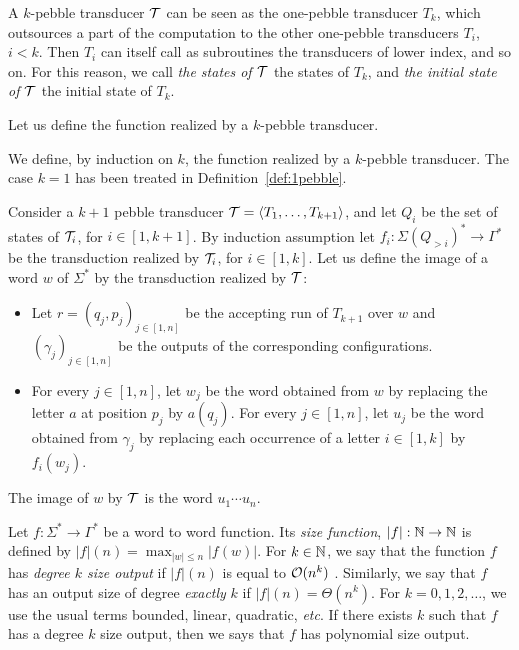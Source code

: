  \medskip
\begin{terminology} 
 A $k$-pebble transducer ${\mathcal T}$ can be seen as the one-pebble transducer $T_k$, which outsources a part of the computation to the other one-pebble transducers $T_i$, $i<k$. Then $T_i$ can itself call as subroutines the transducers of lower index, and so on.
 For this reason, we call \emph{the states of ${\mathcal T}$} the states of $T_k$, and \emph{the initial state of ${\mathcal T}$} the initial state of $T_k$. 
  \end{terminology}
  
  \smallskip
 Let us define the function realized by a $k$-pebble transducer. 
  
  \begin{definition}
We define, by induction on $k$, the function realized by a $k$-pebble transducer. The case $k=1$ has been treated in Definition~\ref{def:1pebble}. 

Consider a $k+1$ pebble transducer ${\mathcal T}=\langle T_1,\ldots,T_{k+1} \rangle$, and let $Q_i$ be the set of states of ${\mathcal T}_i$, for $i\in [1,k+1]$. By induction assumption let $f_i:\Sigma(Q_{>i})^*\rightarrow \Gamma^*$ be the transduction realized by ${\mathcal T}_i$, for $i\in [1,k]$.
Let us define the image of a word $w$ of $\Sigma^*$ by the transduction realized by ${\mathcal T}$:
\begin{itemize}
  \item Let $r=(q_j,p_j)_{j\in[1, n]}$ be the accepting run of $T_{k+1}$ over $w$ and $(\gamma_j)_{j\in[1, n]}$ be the outputs of the corresponding configurations.
  
  \item  For every $j\in[1,n]$, let $w_j$ be the word obtained from $w$ by replacing the letter $a$ at position $p_j$ by $a(q_j)$.
      For every $j\in[1,n]$, let $u_j$ be the word obtained from $\gamma_j$ by replacing each occurrence of a letter $i\in [1,k]$ by $f_i(w_j)$.
  
  \end{itemize}
  The image of $w$ by ${\mathcal T}$ is the word $u_1\cdots u_n$.
\end{definition}


\begin{definition}
  Let $f:\Sigma^*\rightarrow \Gamma^*$ be a word to word function. Its \emph{size function}, $|f|:\mathbb{N}\rightarrow \mathbb{N}$ is defined by $|f|(n)=\max_{|w|\leq n}|f(w)|$. For $k\in \mathbb{N}$, we say that the function $f$ has \emph{degree $k$ size output} if $|f|(n)$ is equal to ${\mathcal O}(n^k)$ . Similarly, we say that $f$ has an output size of degree \emph{exactly} $k$ if $|f|(n)=\Theta(n^k)$. For $k=0,1,2,\ldots$, we use the usual terms bounded, linear, quadratic, \textit{etc}.
  If there exists $k$ such that $f$ has a degree $k$ size output, then we says that $f$ has polynomial size output.
  
\end{definition}

